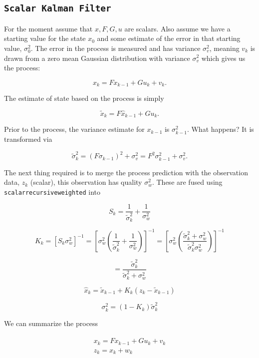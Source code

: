 \hypertarget{scalar-kalman-filter}{%
\subsection{\texorpdfstring{\texttt{Scalar\ Kalman\ Filter}}{Scalar Kalman Filter}}\label{scalar-kalman-filter}}

For the moment assume that \(x, F, G, u\) are scalars. Also assume we
have a starting value for the state \(x_0\) and some estimate of the
error in that starting value, \(\sigma_0^2\). The error in the process
is measured and has variance \(\sigma_v^2\), meaning \(v_k\) is drawn
from a zero mean Gaussian distribution with variance \(\sigma_v^2\)
which gives us the process:

\[x_k = Fx_{k-1} + Gu_k  + v_k .\]

The estimate of state based on the process is simply

\[\tilde{x}_k = F\hat{x}_{k-1} + Gu_k .\]

Prior to the process, the variance estimate for \(x_{k-1}\) is
\(\sigma_{k-1}^2\). What happens? It is transformed via

\[\tilde{\sigma}_{k}^2 = (F \sigma_{k-1})^2 + \sigma_v^2 = F^2\sigma_{k-1}^2 + \sigma_v^2 .\]

The next thing required is to merge the process prediction with the
observation data, \(z_k\) (scalar), this observation has quality
\(\sigma_w^2\). These are fused using \texttt{scalarrecursiveweighted}
into

\[S_k = \frac{1}{\tilde{\sigma}_k^2} + \frac{1}{{\sigma}_w^2}\]

\[K_{k} = \displaystyle \left[ S_{k}\sigma_{w}^2\right]^{-1} =  \left[ {\sigma}_{w}^2 \left(\frac{1}{\tilde{\sigma}_k^2} + \frac{1}{\sigma_w^2}\right) \right]^{-1}
=  \left[ {\sigma}_{w}^2 \left(\frac{\tilde{\sigma}_k^2 + \sigma_w^2}{\tilde{\sigma}_k^2  \sigma_w^2}\right) \right]^{-1}\]

\[=  \frac{\tilde{\sigma}_k^2}{\tilde{\sigma}_k^2 + \sigma_w^2}\]

\[\hat{x}_{k} =  \tilde{x}_{k-1} +  K_{k}\left(  z_{k}- \tilde{x}_{k-1} \right)\]

\[\displaystyle \sigma_k^{2} = (1 - K_k)\tilde{\sigma}_k^{2}\]

We can summarize the process

\[\begin{aligned}
\begin{array}{l}
x_k = Fx_{k-1} + Gu_k + v_k\\
z_k = x_k + w_k
\end{array}
\end{aligned}\]

